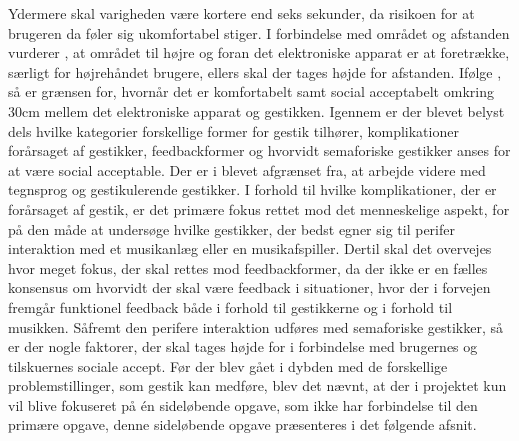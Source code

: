 Ydermere skal varigheden være kortere end seks sekunder, da risikoen for at brugeren da føler sig ukomfortabel stiger. I forbindelse med området og afstanden vurderer \textcite[s. 201]{PDF:AreYouComfortableDoingThat}, at området til højre og foran det elektroniske apparat er at foretrække, særligt for højrehåndet brugere, ellers skal der tages højde for afstanden. Ifølge \textcite[s. 201]{PDF:AreYouComfortableDoingThat}, så er grænsen for, hvornår det er komfortabelt samt social acceptabelt  omkring 30cm mellem det elektroniske apparat og gestikken.\blankline
%
Igennem  er der blevet belyst dels hvilke kategorier forskellige former for gestik tilhører, komplikationer forårsaget af gestikker, feedbackformer og hvorvidt semaforiske gestikker anses for at være social acceptable. Der er i  blevet afgrænset fra, at arbejde videre med tegnsprog og gestikulerende gestikker. I forhold til hvilke komplikationer, der er forårsaget af gestik, er det primære fokus rettet mod det menneskelige aspekt, for på den måde at undersøge hvilke gestikker, der bedst egner sig til perifer interaktion med et musikanlæg eller en musikafspiller. Dertil skal det overvejes hvor meget fokus, der skal rettes mod feedbackformer, da der ikke er en fælles konsensus om hvorvidt der skal være feedback i situationer, hvor der i forvejen fremgår funktionel feedback både i forhold til gestikkerne og i forhold til musikken. Såfremt den perifere interaktion udføres med semaforiske gestikker, så er der nogle faktorer, der skal tages højde for i forbindelse med brugernes og tilskuernes sociale accept. Før der blev gået i dybden med de forskellige problemstillinger, som gestik kan medføre, blev det nævnt, at der i projektet kun vil blive fokuseret på én sideløbende opgave, som ikke har forbindelse til den primære opgave, denne sideløbende opgave præsenteres i det følgende afsnit.








